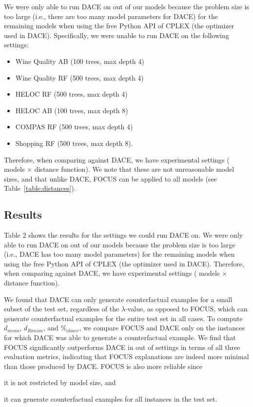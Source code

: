 We were only able to run DACE on  out of our  models because the problem size is too large (i.e., there are too many model parameters for DACE) for the remaining  models when using the free Python API of CPLEX (the optimizer used in DACE). 
Specifically, we were unable to run DACE on the following settings:
\begin{itemize}
\setlength\itemsep{0.4em}
	\item Wine Quality AB (100 trees, max depth 4)
	\item Wine Quality RF (500 trees, max depth 4)
	\item HELOC RF (500 trees, max depth 4)
	\item HELOC AB (100 trees, max depth 8)
	\item COMPAS RF (500 trees, max depth 4)
	\item Shopping RF (500 trees, max depth 8).
\end{itemize}
Therefore, when comparing against DACE, we have  experimental settings ( models $\times$  distance function).
We note that these are not unreasonable model sizes, and that unlike DACE, FOCUS can be applied to all  models (see Table~\ref{table:distances}). 



\subsection{Results}
Table 2 shows the results for the  settings we could run DACE on. 
We were only able to run DACE on  out of our  models because the problem size is too large (i.e., DACE has too many model parameters) for the remaining  models when using the free Python API of CPLEX (the optimizer used in DACE). 
Therefore, when comparing against DACE, we have  experimental settings ( models $\times$  distance function).

We found that DACE can only generate counterfactual examples for a small subset of the test set, regardless of the $\lambda$-value, as opposed to FOCUS, which can generate counterfactual examples for the entire test set in all cases. 
To compute $d_{mean}$, $d_{Rmean}$, and $\mathit{\%_{closer}}$, we compare FOCUS and DACE only on the instances for which DACE was able to generate a counterfactual example. 
We find that FOCUS significantly outperforms DACE in  out of  settings in terms of all three evaluation metrics, indicating that FOCUS explanations are indeed more minimal than those produced by DACE. 
FOCUS is also more reliable since 
\begin{inparaenum}[(i)]
\item it is not restricted by model size, and
\item it can generate counterfactual examples for all instances in the test set. 
\end{inparaenum}

